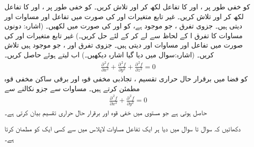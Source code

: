  کو خفی طور پر ،  اور  کا تفاعل لکھ کر  اور  تلاش کریں۔
 کو خفی طور پر ،  اور  کا تفاعل لکھ کر  اور  تلاش کریں۔
غیر تابع متغیرات  اور  کی صورت میں تفاعل   اور  مساوات  اور  دیتی ہیں۔ جزوی تفرق  ،  جو موجود ہے، کو  اور  کی صورت میں لکھیں۔ (اشارہ: دونوں مساوات کا تفرق   ا کے لحاظ سے لے کر  کے لئے حل کریں۔)
غیر تابع متغیرات  اور  کی صورت میں تفاعل   اور  مساوات  اور  دیتی ہیں۔ جزوی تفرق  اور   ،  جو موجود  ہیں تلاش کریں۔ (اشارہ:سوال  میں دیا گیا اشارہ دیکھیں۔)   اب  لیتے ہوئے  حاصل کریں۔
\\
\begin{align}\label{مساوات_کثیر_المتغیر_مساوات_لاپلاس_الف}
\frac{\partial^{\,2}f}{\partial x^2}+\frac{\partial^{\,2}f}{\partial y^2}+\frac{\partial^{\,2}f}{\partial z^2}=0
\end{align}
کو فضا میں  برقرار حال حراری تقسیم ، تجاذبی  مخفی قوہ اور برقی ساکن مخفی قوہ   مطمئن کرتے ہیں۔ مساوات  سے جزو  نکالنے سے    
 \begin{align}\label{مساوات_کثیر_المتغیر_مساوات_لاپلاس_ب}
\frac{\partial^{\,2}f}{\partial x^2}+\frac{\partial^{\,2}f}{\partial y^2}=0
\end{align}
حاصل ہوتی ہے جو مستوی میں  خفی قوہ اور برقرار حال حراری تقسیم  بیان کرتی ہے۔

دکھائیں کہ سوال  تا سوال  میں  دیا ہر ایک  تفاعل مساوات لاپلاس میں سے کسی ایک کو مطمئن کرتا ہے۔ 


